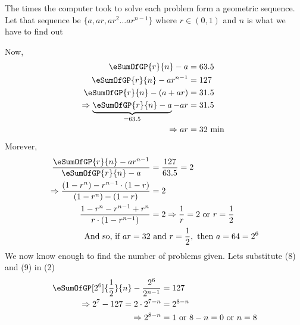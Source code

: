 \begin{solution}[\fullpage]
	The times the computer took to solve each problem form a geometric sequence. Let 
	that sequence be $\lbrace a, ar, ar^2 \ldots ar^{n-1}\rbrace$ where $r \in (0,1)$ and $n$
	is what we have to find out
	
	Now,
	\begin{align}
		\eSumOfGP{r}{n} - a &= 63.5 \\
		\eSumOfGP{r}{n} - ar^{n-1} &= 127 \\
		\eSumOfGP{r}{n} - (a + ar) &= 31.5 \\
		\Rightarrow \underbrace{\eSumOfGP{r}{n} - a}_{=63.5} - ar &= 31.5 \\
		\Rightarrow ar &= 32\text{ min }
	\end{align}
	Morever, 
	\begin{align}
		\dfrac{\eSumOfGP{r}{n} - ar^{n-1}}{\eSumOfGP{r}{n} - a} &= \frac{127}{63.5} = 2 \\
		\Rightarrow \dfrac{(1-r^n) - r^{n-1}\cdot(1-r)}{(1-r^n) - (1-r)} &= 2  \\
		\dfrac{1-r^n-r^{n-1}+r^n}{r\cdot(1-r^{n-1})} &= 2 \Rightarrow \dfrac{1}{r} = 2 
		\text{ or } r = \frac{1}{2} \\
		\text{And so, if } ar = 32 &\text{ and } r = \frac{1}{2}, \text{ then } a = 64 = 2^6
	\end{align}
	We now know enough to find the number of problems given. Lets substitute (8) and (9) in (2)
	\begin{align}
		\eSumOfGP[2^6]{\frac{1}{2}}{n}-\dfrac{2^6}{2^{n-1}} &= 127 \\
		\Rightarrow 2^7-127 = 2\cdot 2^{7-n} &= 2^{8-n} \\
		\Rightarrow 2^{8-n} &= 1 \text{ or } 8-n = 0 \text{ or } n = 8
	\end{align}
\end{solution}
